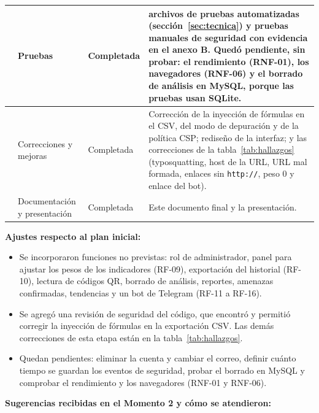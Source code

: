 \documentclass[journal,onecolumn,12pt,draftclsnofoot]{IEEEtran}
\begin{document}
\begin{longtable}{|>{\raggedright\arraybackslash}p{}|>{\raggedright\arraybackslash}p{}|>{\raggedright\arraybackslash}p{}|>{\raggedright\arraybackslash}p{}|}
8 & Pruebas & Completada & 16 archivos de pruebas automatizadas (sección~\ref{sec:tecnica}) y pruebas manuales de seguridad con evidencia en el anexo B. Quedó pendiente, sin probar: el rendimiento (RNF-01), los navegadores (RNF-06) y el borrado de análisis en MySQL, porque las pruebas usan SQLite. \\ \hline
9 & Correcciones y mejoras & Completada & Corrección de la inyección de fórmulas en el CSV, del modo de depuración y de la política CSP; rediseño de la interfaz; y las correcciones de la tabla~\ref{tab:hallazgos} (typosquatting, host de la URL, URL mal formada, enlaces sin \texttt{http://}, peso 0 y enlace del bot). \\ \hline
10 & Documentación y presentación & Completada & Este documento final y la presentación. \\ \hline
\end{longtable}
\endgroup

\textbf{Ajustes respecto al plan inicial:}

\begin{itemize}
  \item Se incorporaron funciones no previstas: rol de administrador, panel para ajustar los pesos de los indicadores (RF-09), exportación del historial (RF-10), lectura de códigos QR, borrado de análisis, reportes, amenazas confirmadas, tendencias y un bot de Telegram (RF-11 a RF-16).
  \item Se agregó una revisión de seguridad del código, que encontró y permitió corregir la inyección de fórmulas en la exportación CSV. Las demás correcciones de esta etapa están en la tabla~\ref{tab:hallazgos}.
  \item Quedan pendientes: eliminar la cuenta y cambiar el correo, definir cuánto tiempo se guardan los eventos de seguridad, probar el borrado en MySQL y comprobar el rendimiento y los navegadores (RNF-01 y RNF-06).
\end{itemize}

\textbf{Sugerencias recibidas en el Momento 2 y cómo se atendieron:}
\end{document}
